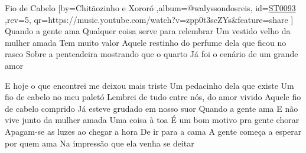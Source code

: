 \beginsong
{Fio de Cabelo %
}[by={Chitãozinho e Xororó %
},album={@walyssondosreis},
id={\href{https://music.youtube.com/watch?v=zpp0t3scZYs&feature=share %
}{ST0093 %
}},rev={5}, %
qr={https://music.youtube.com/watch?v=zpp0t3scZYs&feature=share %
}]
\beginverse
 Quando a gente ama
Qualquer coisa serve para relembrar
Um vestido velho da mulher amada
Tem muito valor
Aquele restinho do perfume dela que ficou no rasco
Sobre a penteadeira mostrando que o quarto
Já foi o cenário de um grande amor
\endverse

\beginchorus
E hoje o que encontrei me deixou mais triste
Um pedacinho dela que existe
Um fio de cabelo no meu paletó
Lembrei de tudo entre nós, do amor vivido
Aquele fio de cabelo comprido
Já esteve grudado em nosso suor
\endchorus
{}
\beginverse
 Quando a gente ama
E não vive junto da mulher amada
Uma coisa à toa
É um bom motivo pra gente chorar
Apagam-se as luzes ao chegar a hora
De ir para a cama
A gente começa a esperar por quem ama
Na impressão que ela venha se deitar
\endverse
{}
\vspace{4em} %
\begin{comment}
\lstset{basicstyle=\scriptsize\bf} %
\tab{Solo 1}
\begin{lstlisting}
E|-----------------------------------------------------|
B|-----------------------------------------------------|
G|-----------------------------------------------------|
D|-----------------------------------------------------|
A|-----------------------------------------------------|
E|-----------------------------------------------------|
\end{lstlisting}
\end{comment}

